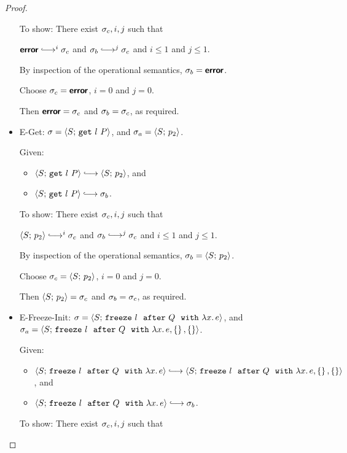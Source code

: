\begin{proof}
\begin{itemize}
      To show: There exist $\sigma_c, i, j$ such that

      $\error \parstepsto^i \conf_c$ and $\conf_b \parstepsto^j
      \conf_c$ and $i \leq 1$ and $j \leq 1$.

      By inspection of the operational semantics, $\sigma_b = \textbf{\textsf{error}}$.

      Choose $\sigma_c = \textbf{\textsf{error}}$, $i = 0$ and $j = 0$.

      Then $\textbf{\textsf{error}} = \sigma_c$ and $\sigma_b = \sigma_c$, as required.

    \item {\sc E-Get}: $\sigma = \langle S;\, \mbox{\texttt{get}}~l~P \rangle$, and
      $\sigma_a = \langle S;\, p_2 \rangle$.

      Given:
      \begin{itemize}
      \item $\config{S}{\getexp{l}{P}} \parstepsto \config{S}{p_2}$,
        and
      \item $\config{S}{\getexp{l}{P}} \parstepsto \conf_b$.
      \end{itemize}

      To show: There exist $\sigma_c, i, j$ such that

      $\config{S}{p_2} \parstepsto^i \conf_c$ and $\conf_b
      \parstepsto^j \conf_c$ and $i \leq 1$ and $j \leq 1$.

      By inspection of the operational semantics, $\sigma_b =
      \langle S;\, p_2 \rangle$.

      Choose $\sigma_c = \langle S;\, p_2 \rangle$, $i = 0$ and $j = 0$.

      Then $\langle S;\, p_2 \rangle = \sigma_c$ and $\sigma_b = \sigma_c$, as
      required.

    \item {\sc E-Freeze-Init}: $\sigma =
      \langle S;\, \mbox{\texttt{freeze}}~l~~{\mbox{\texttt{after}}}~Q~~{\mbox{\texttt{with}}}~\lambda x.\,e \rangle$, and $\sigma_a =
      \langle S;\, \mbox{\texttt{freeze}}~l~~{\mbox{\texttt{after}}}~Q~~{\mbox{\texttt{with}}}~\lambda x.\,e, \left\{\right\}, \left\{\right\} \rangle$.

      Given:
      \begin{itemize}
      \item $\config{S}{\freezeafter{l}{Q}{\lam{x}{e}}} \parstepsto
        \config{S}{\freezeafterfull{l}{Q}{\lam{x}{e}}{\setof{}}{\setof{}}}$,
        and
      \item $\config{S}{\freezeafter{l}{Q}{\lam{x}{e}}} \parstepsto
        \conf_b$.
      \end{itemize}

      To show: There exist $\sigma_c, i, j$ such that


\end{itemize}
\end{proof}
